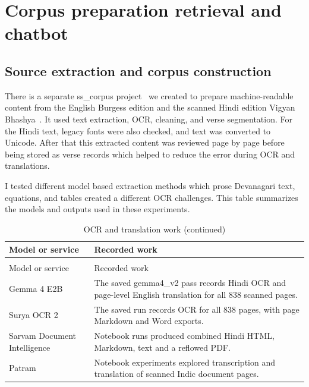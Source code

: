 \documentclass[12pt,a4paper,oneside]{report}
\begin{document}
\section{Corpus preparation retrieval and chatbot}
\label{sec:corpus-chatbot}

\subsection{Source extraction and corpus construction}

There is a separate ss\_corpus project~\cite{nigam_sscorpus} we created to prepare machine-readable content from the English Burgess edition and the scanned Hindi edition Vigyan Bhashya~\cite{burgess1860,shrivastava}. It used text extraction, OCR, cleaning, and verse segmentation. For the Hindi text, legacy fonts were also checked, and text was converted to Unicode. After that this extracted content was reviewed page by page before being stored as verse records which helped to reduce the error during OCR and translations.

I tested different model based extraction methods which prose Devanagari text, equations, and tables created a different OCR challenges. This table summarizes the models and outputs used in these experiments.

\begin{longtable}[]{@{}
  >{\raggedright\arraybackslash}p{}
  >{\raggedright\arraybackslash}p{}@{}}
\caption{OCR and translation work}\label{tab:ocr}\\
\toprule\noalign{}
Model or service & Recorded work \\
\midrule\noalign{}
\endfirsthead
\caption[]{OCR and translation work (continued)}\\
\toprule\noalign{}
Model or service & Recorded work \\
\midrule\noalign{}
\endhead
\bottomrule\noalign{}
\endlastfoot
Gemma 4 E2B~\cite{gemma} & The saved gemma4\_v2 pass records Hindi OCR and page-level English translation for all 838 scanned pages. \\
Surya OCR 2~\cite{suryaocr} & The saved run records OCR for all 838 pages, with page Markdown and Word exports. \\
Sarvam Document Intelligence~\cite{sarvam} & Notebook runs produced combined Hindi HTML, Markdown, text and a reflowed PDF. \\
Patram~\cite{patram} & Notebook experiments explored transcription and translation of scanned Indic document pages. \\
\end{longtable}
\end{document}
